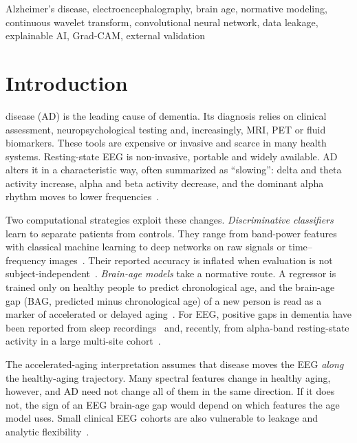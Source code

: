 \documentclass[journal]{IEEEtran}
\begin{document}
\begin{IEEEkeywords}
Alzheimer's disease, electroencephalography, brain age, normative modeling, continuous wavelet transform, convolutional neural network, data leakage, explainable AI, Grad-CAM, external validation
\end{IEEEkeywords}

\section{Introduction}
 disease (AD) is the leading cause of dementia. Its diagnosis relies on clinical assessment, neuropsychological testing and, increasingly, MRI, PET or fluid biomarkers. These tools are expensive or invasive and scarce in many health systems. Resting-state EEG is non-invasive, portable and widely available. AD alters it in a characteristic way, often summarized as ``slowing'': delta and theta activity increase, alpha and beta activity decrease, and the dominant alpha rhythm moves to lower frequencies~\cite{jeong2004,babiloni2020}.

Two computational strategies exploit these changes. \emph{Discriminative classifiers} learn to separate patients from controls. They range from band-power features with classical machine learning to deep networks on raw signals or time--frequency images~\cite{craik2019,roy2019}. Their reported accuracy is inflated when evaluation is not subject-independent~\cite{brookshire2024,delpup2025}. \emph{Brain-age models} take a normative route. A regressor is trained only on healthy people to predict chronological age, and the brain-age gap (BAG, predicted minus chronological age) of a new person is read as a marker of accelerated or delayed aging~\cite{cole2017,franke2019}. For EEG, positive gaps in dementia have been reported from sleep recordings~\cite{ye2020} and, recently, from alpha-band resting-state activity in a large multi-site cohort~\cite{otero2026}.

The accelerated-aging interpretation assumes that disease moves the EEG \emph{along} the healthy-aging trajectory. Many spectral features change in healthy aging, however, and AD need not change all of them in the same direction. If it does not, the sign of an EEG brain-age gap would depend on which features the age model uses. Small clinical EEG cohorts are also vulnerable to leakage and analytic flexibility~\cite{brookshire2024,varoquaux2018}.
\end{document}
